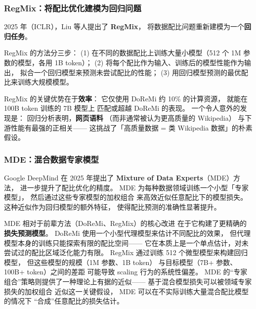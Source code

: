 \subsubsection{RegMix：将配比优化建模为回归问题}

2025 年（ICLR），Liu 等人提出了 \textbf{RegMix}，
将数据配比问题重新建模为一个\textbf{回归任务}。

RegMix 的方法分三步：
(1) 在不同的数据配比上训练大量小模型（512 个 1M 参数的模型，各用 1B token）；
(2) 将每个配比作为输入、训练后的模型性能作为输出，
拟合一个回归模型来预测未尝试配比的性能；
(3) 用回归模型预测的最优配比来训练大规模模型。

RegMix 的关键优势在于\textbf{效率}：
它仅使用 DoReMi 约 10\% 的计算资源，
就能在 100B token 训练的 7B 模型上
匹配或超越 DoReMi 的表现。
一个令人意外的发现是：
回归分析表明，\textbf{网页语料}
（而非通常被认为更高质量的 Wikipedia）
与下游性能有最强的正相关——
这挑战了「高质量数据 = 类 Wikipedia 数据」的朴素假设。

\subsubsection{MDE：混合数据专家模型}

Google DeepMind 在 2025 年提出了
\textbf{Mixture of Data Experts}（MDE）方法，
进一步提升了配比优化的精度。
MDE 为每种数据领域训练一个小型「专家模型」，
然后通过这些专家模型的加权组合
来高效近似任意配比下的模型损失。
这种近似作为回归模型的额外特征，
使得配比预测的准确性显著提升。

MDE 相对于前辈方法（DoReMi、RegMix）的核心改进
在于它构建了更精确的\textbf{损失预测模型}。
DoReMi 使用一个小型代理模型来估计不同配比的效果，
但代理模型本身的训练只能探索有限的配比空间——
它在本质上是一个单点估计，对未尝试过的配比区域泛化能力有限。
RegMix 通过训练 512 个微型模型来构建回归模型，
但这些模型的规模（1M 参数、1B token）
与目标模型（7B+ 参数、100B+ token）之间的差距
可能导致 scaling 行为的系统性偏差。
MDE 的``专家组合''策略则提供了一种理论上有据的近似——
基于混合模型损失可以被领域专家损失的加权组合
近似这一关键假设，
MDE 可以在不实际训练大量混合配比模型的情况下
``合成''任意配比的损失估计。


